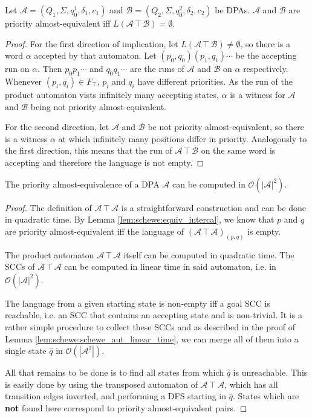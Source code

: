\begin{lem}
\label{lem:schewe:equiv_intercal}
	Let $\mathcal{A} = (Q_1, \Sigma, q^1_0, \delta_1, c_1)$ and $\mathcal{B} = (Q_2, \Sigma, q^2_0, \delta_2, c_2)$ be DPAs. $\mathcal{A}$ and $\mathcal{B}$ are priority almost-equivalent iff $L(\mathcal{A} \intercal \mathcal{B}) = \emptyset$. 
\end{lem}

\begin{proof}
	For the first direction of implication, let $L(\mathcal{A} \intercal \mathcal{B}) \neq \emptyset$, so there is a word $\alpha$ accepted by that automaton. Let $(p_0, q_0) (p_1, q_1) \cdots$ be the accepting run on $\alpha$. Then $p_0 p_1 \cdots$ and $q_0 q_1 \cdots$ are the runs of $\mathcal{A}$ and $\mathcal{B}$ on $\alpha$ respectively. Whenever $(p_i, q_i) \in F_\intercal$, $p_i$ and $q_i$ have different priorities. As the run of the product automaton vists infinitely many accepting states, $\alpha$ is a witness for $\mathcal{A}$ and $\mathcal{B}$ being not priority almost-equivalent.
	
	For the second direction, let $\mathcal{A}$ and $\mathcal{B}$ be not priority almost-equivalent, so there is a witness $\alpha$ at which infinitely many positions differ in priority. Analogously to the first direction, this means that the run of $\mathcal{A} \intercal \mathcal{B}$ on the same word is accepting and therefore the language is not empty.
\end{proof}

\begin{lem}
	The priority almost-equivalence of a DPA $\mathcal{A}$ can be computed in $\mathcal{O}(|\mathcal{A}|^2)$.
\end{lem}


\begin{proof}
	The definition of $\mathcal{A} \intercal \mathcal{A}$ is a straightforward construction and can be done in quadratic time. By Lemma \ref{lem:schewe:equiv_intercal}, we know that $p$ and $q$ are priority almost-equivalent iff the language of $(\mathcal{A} \intercal \mathcal{A})_{(p,q)}$ is empty. 

	The product automaton $\mathcal{A} \intercal \mathcal{A}$ itself can be computed in quadratic time. The SCCs of $\mathcal{A} \intercal \mathcal{A}$ can be computed in linear time in said automaton, i.e. in $\mathcal{O}(|\mathcal{A}|^2)$.
	
	The language from a given starting state is non-empty iff a goal SCC is reachable, i.e. an SCC that contains an accepting state and is non-trivial. It is a rather simple procedure to collect these SCCs and as described in the proof of Lemma \ref{lem:schewe:schewe_aut_linear_time}, we can merge all of them into a single state $\hat{q}$ in $\mathcal{O}(|\mathcal{A}^2|)$.
	
	All that remains to be done is to find all states from which $\hat{q}$ is unreachable. This is easily done by using the transposed automaton of $\mathcal{A} \intercal \mathcal{A}$, which has all transition edges inverted, and performing a DFS starting in $\hat{q}$. States which are \textbf{not} found here correspond to priority almost-equivalent pairs.
\end{proof}



